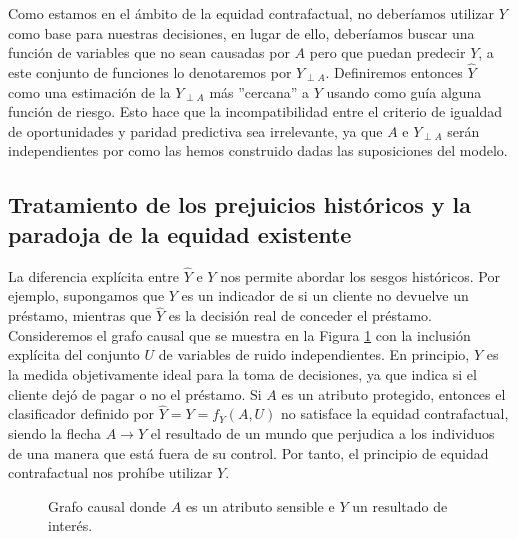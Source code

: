 \documentclass[oneside,openright,titlepage,numbers=noenddot,openany,headinclude,footinclude=true,
cleardoublepage=empty,abstractoff,BCOR=5mm,paper=a4,fontsize=12pt,main=spanish]{scrreprt}
\begin{document}
Como estamos en el ámbito de la equidad contrafactual, no deberíamos utilizar $Y$ como base para nuestras decisiones, en lugar de ello, deberíamos buscar una función de variables que no sean causadas por $A$ pero que puedan predecir $Y$, a este conjunto de funciones lo denotaremos por $Y_{\perp A}$. Definiremos entonces $\hat{Y}$ como una estimación de la $Y_{\perp A}$ más ''cercana'' a $Y$ usando como guía alguna función de riesgo. Esto hace que la incompatibilidad entre el criterio de igualdad de oportunidades y paridad predictiva sea irrelevante, ya que $A$ e $Y_{\perp A}$ serán independientes por como las hemos construido dadas las suposiciones del modelo.

\subsection*{Tratamiento de los prejuicios históricos y la paradoja de la equidad existente}

La diferencia explícita entre $\hat{Y}$ e $Y$ nos permite abordar los sesgos históricos. Por ejemplo, supongamos que $Y$ es un indicador de si un cliente no devuelve un préstamo, mientras que $\hat{Y}$ es la decisión real de conceder el préstamo. Consideremos el grafo causal que se muestra en la Figura \ref{fig:grafotratam} con la inclusión explícita del conjunto $U$ de variables de ruido independientes. En principio, $Y$ es la medida objetivamente ideal para la toma de decisiones, ya que indica si el cliente dejó de pagar o no el préstamo. Si $A$ es un atributo protegido, entonces el clasificador definido por $\hat{Y} = Y = f_Y (A, U)$ no satisface la equidad contrafactual, siendo la flecha $A \to Y$ el resultado de un mundo que perjudica a los individuos de una manera que está fuera de su control. Por tanto, el principio de equidad contrafactual nos prohíbe utilizar $Y$.\\

\begin{figure}[h]
\centering
{}
\caption{Grafo causal donde $A$ es un atributo sensible e $Y$ un resultado de interés.}
\label{fig:grafotratam}
\end{figure}
\end{document}
